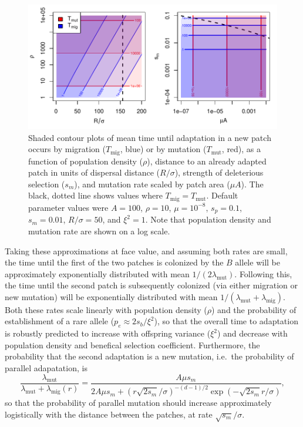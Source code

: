 \documentclass{article}
\newcommand{\migrate}{\lambda_\text{mig}}
\newcommand{\mutrate}{\lambda_\text{mut}}
\newcommand{\Tmig}{T_\text{mig}}
\newcommand{\Tmut}{T_\text{mut}}
\begin{document}
\begin{figure}[ht]
  \begin{center}
    \includegraphics{phase-diagram-log}
  \end{center}
  \caption{
  Shaded contour plots of
  mean time until adaptation in a new patch occurs by migration ($\Tmig$, blue) or by mutation ($\Tmut$, red),
  as a function of population density ($\rho$), 
  distance to an already adapted patch in units of dispersal distance ($R/\sigma$),
  strength of deleterious selection ($s_m$),
  and mutation rate scaled by patch area ($\mu A$).
  The black, dotted line shows values where $\Tmig=\Tmut$.
  Default parameter values were $A=100$, $\rho=10$, $\mu=10^{-8}$, $s_p=0.1$, $s_m=0.01$, $R/\sigma=50$, and $\xi^2=1$.
  Note that population density and mutation rate are shown on a log scale.
  \label{fig:phase_diagram}
  }
\end{figure}

Taking these approximations at face value, 
and assuming both rates are small, 
the time until the first of the two patches is colonized by the $B$
allele will be approximately exponentially distributed with mean $1/(2
\mutrate)$.
Following this, the time until the second patch is subsequently colonized 
(via either migration or new mutation) 
will be exponentially distributed with mean $1/(\mutrate+\migrate)$.
Both these rates scale linearly with population density ($\rho$) 
and the probability of establishment of a rare allele ($p_e\approx 2 s_b/\xi^2$),
so that the overall time to adaptation is robustly predicted to increase with offspring variance ($\xi^2$)
and decrease with population density and benefical selection coefficient.
Furthermore, the probability that the second adaptation is a new mutation,
i.e.\ the probability of parallel adapatation, is 
\begin{equation} \label{eqn:parallel_prob}
  \frac{\mutrate}{\mutrate+\migrate(r)} = \frac{ A \mu s_m }{2 A \mu s_m + \left(r \sqrt{2 s_m} /\sigma \right)^{-(d-1)/2}\exp\left(- \sqrt{2 s_m} r / \sigma \right) },  
\end{equation}
so that the probability of parallel mutation should increase
approximately logistically with the distance between the patches, at rate $\sqrt{s_m} /\sigma$. 
\end{document}
